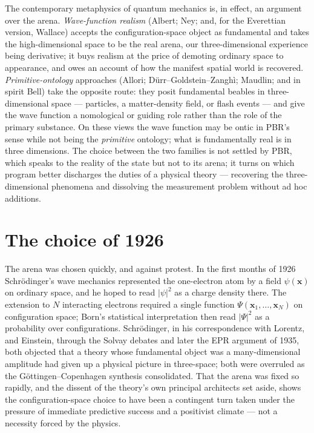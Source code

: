 The contemporary metaphysics of quantum mechanics is, in effect, an argument over the arena. \emph{Wave-function
realism} (Albert; Ney; and, for the Everettian version, Wallace) accepts the configuration-space object as
fundamental and takes the high-dimensional space to be the real arena, our three-dimensional experience being
derivative; it buys realism at the price of demoting ordinary space to appearance, and owes an account of how the
manifest spatial world is recovered. \emph{Primitive-ontology} approaches (Allori; D\"urr--Goldstein--Zangh\`i;
Maudlin; and in spirit Bell) take the opposite route: they posit fundamental beables in three-dimensional space
--- particles, a matter-density field, or flash events --- and give the wave function a nomological or guiding
role rather than the role of the primary substance. On these views the wave function may be ontic in PBR's sense
while not being the \emph{primitive} ontology; what is fundamentally real is in three dimensions. The choice
between the two families is not settled by PBR, which speaks to the reality of the state but not to its arena; it
turns on which program better discharges the duties of a physical theory --- recovering the three-dimensional
phenomena and dissolving the measurement problem without ad hoc additions.

\section{The choice of 1926}\label{sec:onto-1926}

The arena was chosen quickly, and against protest. In the first months of 1926 Schr\"odinger's wave mechanics
represented the one-electron atom by a field $\psi(\mathbf x)$ on ordinary space, and he hoped to read
$|\psi|^2$ as a charge density there. The extension to $N$ interacting electrons required a single function
$\Psi(\mathbf x_1,\dots,\mathbf x_N)$ on configuration space; Born's statistical interpretation then read
$|\Psi|^2$ as a probability over configurations. Schr\"odinger, in his correspondence with Lorentz, and Einstein,
through the Solvay debates and later the EPR argument of 1935, both objected that a theory whose fundamental
object was a many-dimensional amplitude had given up a physical picture in three-space; both were overruled as the
G\"ottingen--Copenhagen synthesis consolidated. That the arena was fixed so rapidly, and the dissent of the
theory's own principal architects set aside, shows the configuration-space choice to have been a contingent turn
taken under the pressure of immediate predictive success and a positivist climate --- not a necessity forced by
the physics.

